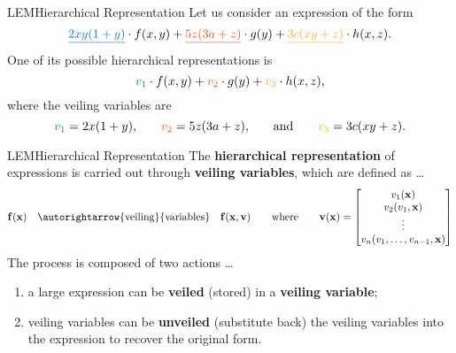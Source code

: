 \begin{frame}{\acl{LEM}}{Hierarchical Representation}
  Let us consider an expression of the form
  \begin{equation*}
    \textcolor{mycolor1}{\underline{2xy(1+y)}} \cdot f(x,y) +
    \textcolor{mycolor2}{\underline{5z(3a+z)}} \cdot g(y) +
    \textcolor{mycolor3}{\underline{3c(xy+z)}} \cdot h(x,z) \text{.}
  \end{equation*}
  One of its possible hierarchical representations is
  \begin{equation*}
    \textcolor{mycolor1}{v_1} \cdot f(x,y) +
    \textcolor{mycolor2}{v_2} \cdot g(y) +
    \textcolor{mycolor3}{v_3} \cdot h(x,z) \text{,}
  \end{equation*}
  where the veiling variables are
  \begin{equation*}
    \textcolor{mycolor1}{v_1} = 2x(1+y) \text{,}
    \qquad
    \textcolor{mycolor2}{v_2} = 5z(3a+z) \text{,}
    \qquad \text{and} \qquad
    \textcolor{mycolor3}{v_3} = 3c(xy+z) \text{.}
  \end{equation*}
\end{frame}

\begin{frame}{\acl{LEM}}{Hierarchical Representation}
  The \textbf{hierarchical representation} of expressions is carried out through \textbf{veiling variables}, which are defined as \dots
  \begin{equation*}
    \m{f}(\mx) \quad \autorightarrow{\text{veiling}}{\text{variables}} \quad \m{f}(\mx, \m{v})
    \qquad \text{where} \qquad
    \m{v}(\mx) = \begin{bmatrix}
      v_{1}(\mx) \\
      v_{2}(v_{1}, \mx) \\
      \vdots \\
      v_{n}(v_{1}, \dots, v_{n-1}, \mx)
    \end{bmatrix}
  \end{equation*}
  The process is composed of two actions \dots
  \begin{enumerate}
    \item a large expression can be \textbf{veiled} (stored) in a \textbf{veiling variable};
    \item veiling variables can be \textbf{unveiled} (substitute back) the veiling variables into the expression to recover the original form.
  \end{enumerate}
  \vspace{0.5em}
\end{frame}

